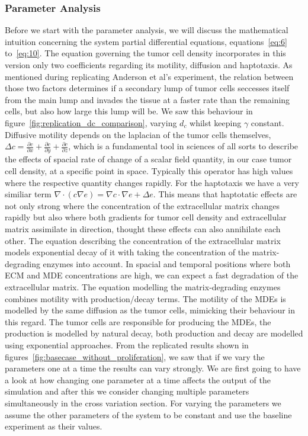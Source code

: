 \subsubsection{Parameter Analysis}
Before we start with the parameter analysis, we will discuss the mathematical intuition concerning the system partial differential equations, equations~\ref{eq:6} to~\ref{eq:10}. \newline The equation governing the tumor cell density incorporates in this version only two coefficients regarding its motility, diffusion and haptotaxis. As mentioned during replicating Anderson et al's experiment, the relation between those two factors determines if a secondary lump of tumor cells seccesses itself from the main lump and invades the tissue at a faster rate than the remaining cells, but also how large this lump will be. We saw this behaviour in figure~\ref{fig:replication_dc_comparison}, varying $d_c$ whilst keeping $\gamma$ constant. Diffusive motility depends on the laplacian of the tumor cells themselves, $\Delta c = \frac{\partial c}{\partial x} + \frac{\partial c}{\partial y} + \frac{\partial c}{\partial z}$, which is a fundamental tool in sciences of all sorts to describe the effects of spacial rate of change of a scalar field quantity, in our case tumor cell density, at a specific point in space. Typically this operator has high values where the respective quantity changes rapidly. For the haptotaxis we have a very similiar term $\nabla \cdot (c\nabla e) = \nabla c \cdot \nabla e + \Delta e$. This means that haptotatic effects are not only strong where the concentration of the extracellular matrix changes rapidly but also where both gradients for tumor cell density and extracellular matrix assimilate in direction, thought these effects can also annihilate each other.\newline 
The equation describing the concentration of the extracellular matrix models exponential decay of it with taking the concentration of the matrix-degrading enzymes into account. In spacial and temporal positions where both ECM and MDE concentrations are high, we can expect a fast degradation of the extracellular matrix.\newline
The equation modelling the matrix-degrading enzymes combines motility with production/decay terms. The motility of the MDEs is modelled by the same diffusion as the tumor cells, mimicking their behaviour in this regard. The tumor cells are responsible for producing the MDEs, the production is modelled by natural decay, both production and decay are modelled using exponential approaches.\newline 
From the replicated results shown in figures~\ref{fig:basecase_without_proliferation}, we saw that if we vary the parameters one at a time the results can vary strongly. We are first going to have a look at how changing one parameter at a time affects the output of the simulation and after this we consider changing multiple parameters simultaneously in the cross variation section. For varying the parameters we assume the other parameters of the system to be constant and use the baseline experiment as their values.

